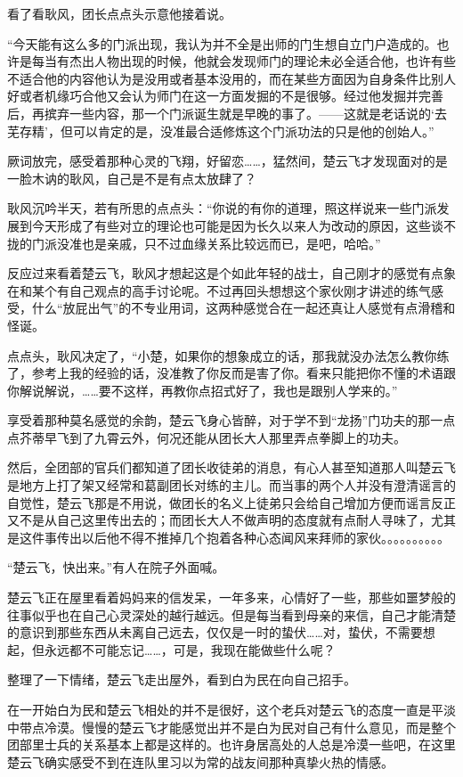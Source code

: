看了看耿风，团长点点头示意他接着说。

“今天能有这么多的门派出现，我认为并不全是出师的门生想自立门户造成的。也许是每当有杰出人物出现的时候，他就会发现师门的理论未必全适合他，也许有些不适合他的内容他认为是没用或者基本没用的，而在某些方面因为自身条件比别人好或者机缘巧合他又会认为师门在这一方面发掘的不是很够。经过他发掘并完善后，再摈弃一些内容，那一个门派诞生就是早晚的事了。——这就是老话说的‘去芜存精’，但可以肯定的是，没准最合适修炼这个门派功法的只是他的创始人。”

厥词放完，感受着那种心灵的飞翔，好留恋……，猛然间，楚云飞才发现面对的是一脸木讷的耿风，自己是不是有点太放肆了？

耿风沉吟半天，若有所思的点点头：“你说的有你的道理，照这样说来一些门派发展到今天形成了有些对立的理论也可能是因为长久以来人为改动的原因，这些谈不拢的门派没准也是亲戚，只不过血缘关系比较远而已，是吧，哈哈。”

反应过来看着楚云飞，耿风才想起这是个如此年轻的战士，自己刚才的感觉有点象在和某个有自己观点的高手讨论呢。不过再回头想想这个家伙刚才讲述的练气感受，什么“放屁出气”的不专业用词，这两种感觉合在一起还真让人感觉有点滑稽和怪诞。

点点头，耿风决定了，“小楚，如果你的想象成立的话，那我就没办法怎么教你练了，参考上我的经验的话，没准教了你反而是害了你。看来只能把你不懂的术语跟你解说解说，……要不这样，再教你点招式好了，我也是跟别人学来的。”

享受着那种莫名感觉的余韵，楚云飞身心皆醉，对于学不到“龙扬”门功夫的那一点点芥蒂早飞到了九霄云外，何况还能从团长大人那里弄点拳脚上的功夫。

然后，全团部的官兵们都知道了团长收徒弟的消息，有心人甚至知道那人叫楚云飞是地方上打了架又经常和葛副团长对练的主儿。而当事的两个人并没有澄清谣言的自觉性，楚云飞那是不用说，做团长的名义上徒弟只会给自己增加方便而谣言反正又不是从自己这里传出去的；而团长大人不做声明的态度就有点耐人寻味了，尤其是这件事传出以后他不得不推掉几个抱着各种心态闻风来拜师的家伙。。。。。。。。。。

“楚云飞，快出来。”有人在院子外面喊。

楚云飞正在屋里看着妈妈来的信发呆，一年多来，心情好了一些，那些如噩梦般的往事似乎也在自己心灵深处的越行越远。但是每当看到母亲的来信，自己才能清楚的意识到那些东西从未离自己远去，仅仅是一时的蛰伏……对，蛰伏，不需要想起，但永远都不可能忘记……，可是，我现在能做些什么呢？

整理了一下情绪，楚云飞走出屋外，看到白为民在向自己招手。

在一开始白为民和楚云飞相处的并不是很好，这个老兵对楚云飞的态度一直是平淡中带点冷漠。慢慢的楚云飞才能感觉出并不是白为民对自己有什么意见，而是整个团部里士兵的关系基本上都是这样的。也许身居高处的人总是冷漠一些吧，在这里楚云飞确实感受不到在连队里习以为常的战友间那种真挚火热的情感。

